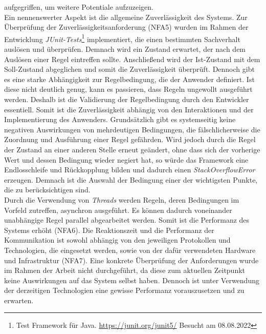         aufgegriffen, um weitere Potentiale aufzuzeigen. 
        \\
        \linebreak
        Ein nennenswerter Aspekt ist die allgemeine Zuverlässigkeit des Systems. Zur Überprüfung der Zuverlässigkeitsanforderung (NFA5) wurden im Rahmen der 
        Entwicklung \textit{JUnit-Tests}\footnote{Test Framework für Java. \url{https://junit.org/junit5/} Besucht am 08.08.2022} implementiert, die 
        einen bestimmten Sachverhalt auslösen und überprüfen. Demnach wird ein Zustand erwartet, der nach dem Auslösen einer Regel eintreffen sollte. Anschließend 
        wird der Ist-Zustand mit dem Soll-Zustand abgeglichen und somit die Zuverlässigkeit überprüft. 
        Dennoch gibt es eine starke Abhängigkeit zur Regelbedingung, die der Anwender definiert. Ist diese 
        nicht deutlich genug, kann es passieren, dass Regeln ungewollt ausgeführt werden. Deshalb ist die Validierung der Regelbedingung durch den 
        Entwickler essentiell. Somit ist die Zuverlässigkeit abhängig von den Interaktionen und der Implementierung des Anwenders. Grundsätzlich gibt es 
        systemseitig keine negativen Auswirkungen von mehrdeutigen Bedingungen, die fälschlicherweise die Zuordnung und Ausführung einer Regel gefährden. Wird jedoch durch die 
        Regel der Zustand an einer anderen Stelle erneut geändert, ohne dass sich der vorherige Wert und dessen Bedingung wieder negiert hat, so würde das 
        Framework eine Endlosschleife und Rückkopplung bilden und dadurch einen \textit{StackOverflowError} erzeugen. Demnach ist die Auswahl der Bedingung einer der wichtigsten 
        Punkte, die zu berücksichtigen sind.
        \\
        \linebreak
        Durch die Verwendung von \textit{Threads} werden Regeln, deren Bedingungen im Vorfeld zutreffen, asynchron ausgeführt. Es können dadurch voneinander 
        unabhängige Regel parallel abgearbeitet werden. Somit ist die Performanz des Systems erhöht (NFA6). Die Reaktionszeit und die Performanz der 
        Kommunikation ist sowohl abhängig von den jeweiligen Protokollen und Technologien, die eingesetzt werden, sowie von der dafür verwendeten Hardware 
        und Infrastruktur (NFA7). Eine konkrete Überprüfung der Anforderungen wurde im Rahmen der Arbeit nicht durchgeführt, da diese zum aktuellen Zeitpunkt keine 
        Auswirkungen auf das System selbst haben. Dennoch ist unter Verwendung der derzeitigen Technologien eine gewisse Performanz vorauszusetzen und zu erwarten. 
